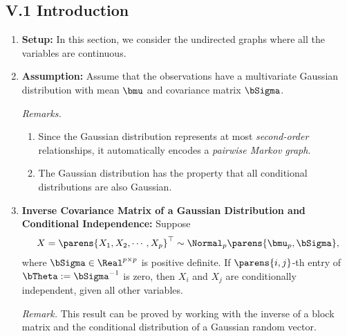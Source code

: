 \documentclass[12pt]{article}
\begin{document}
\subsection*{V.1 Introduction}

\begin{enumerate}[label=\textbf{\arabic*.}]

	\item \textbf{Setup:} In this section, we consider the undirected graphs where all the variables are continuous. 
	
	\item \textbf{Assumption:} Assume that the observations have a multivariate Gaussian distribution with mean $\bmu$ and covariance matrix $\bSigma$. 
	
	\textit{Remarks.}
	\begin{enumerate}
		\item Since the Gaussian distribution represents at most \textit{second-order} relationships, it automatically encodes a \textit{pairwise Markov graph}. 
		\item The Gaussian distribution has the property that all conditional distributions are also Gaussian. 
	\end{enumerate}
	
	\item \textbf{Inverse Covariance Matrix of a Gaussian Distribution and Conditional Independence:} 
	Suppose 
	\begin{align*}
		X = \parens{X_1, X_2, \cdots, X_p}^\top \sim \Normal_p \parens{\bmu_p, \bSigma}, 
	\end{align*}
	where $\bSigma \in \Real^{p \times p}$ is positive definite. If $\parens{i, j}$-th entry of $\bTheta := \bSigma^{-1}$ is zero, then $X_i$ and $X_j$ are conditionally independent, given all other variables. 
	
	\textit{Remark.} This result can be proved by working with the inverse of a block matrix and the conditional distribution of a Gaussian random vector. 
	

\end{enumerate}
\end{document}
